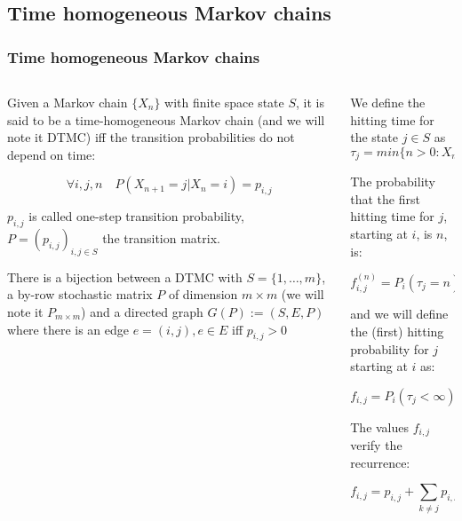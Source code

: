 \subsection{Time homogeneous Markov chains}
 \begin{frame} \frametitle{Time homogeneous Markov chains}
    \begin{columns}
    \begin{column}{0.5\textwidth}
        \begin{definition}
        Given a Markov chain \(\{X_n\}\) with finite space state \(S\), it is said to be a 
        time-homogeneous Markov chain (and we will note it DTMC) iff the transition 
        probabilities do not depend on time:

        \[
        \forall i, j, n \quad P(X_{n + 1} = j | X_{n} = i) = p_{i, j}
        \]

        \(p_{i, j}\) is called one-step transition probability, \(P = (p_{i, j})_{i, j \in S}\) the transition matrix.
        \end{definition}
        
        \begin{remark}
        There is a bijection between a DTMC with $S = \{1, \ldots, m\}$,
        a by-row stochastic matrix $P$ of dimension $m \times m$ (we will note it 
        $P_{m\times m}$) and a directed graph $G(P):=(S, E, P)$ where there is an
        edge $e = (i, j), e \in E$ iff $p_{i,j} > 0$
        \end{remark}
    \end{column}
    
    \begin{column}{0.5\textwidth}
        \begin{definition}
        We define the hitting time for the state \(j \in S\) as 
        $\tau_j = min \{n > 0 : X_n = j \}$
        \end{definition}
        
        \begin{definition}
        The probability that the first hitting time for $j$, starting at $i$, is $n$, is:

        \[
        f_{i,j}^{(n)} = P_i\left(\tau_j = n\right)
        \]

        and we will define the (first) hitting probability for \(j\) starting at \(i\) as:

        \[
        f_{i, j} = P_i\left(\tau_j < \infty\right)
        \]
        \end{definition}
        
        The values $f_{i, j}$ verify the recurrence:

        \[
        f_{i,j} = p_{i,j} + \sum_{k\neq j} p_{i,k} f_{k,j}
        \]
    \end{column}
    \end{columns}
 \end{frame}
